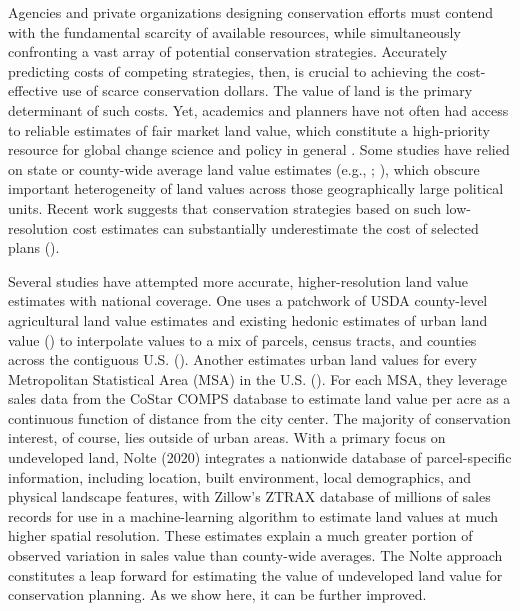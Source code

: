 \documentclass[12pt]{article}
\begin{document}
Agencies and private organizations designing conservation efforts must contend with the fundamental scarcity of available resources, while simultaneously confronting a vast array of potential conservation strategies. Accurately predicting costs of competing strategies, then, is crucial to achieving the cost-effective use of scarce conservation dollars. The value of land is the primary determinant of such costs. Yet, academics and planners have not often had access to reliable estimates of fair market land value, which constitute a high-priority resource for global change science and policy in general \cite{Coomes2018GeospatialPolicy}. Some studies have relied on state or county-wide average land value estimates (e.g., \cite{Withey2012MaximisingUSA}; \cite{Lawler2020PlanningConfiguration}),
which obscure important heterogeneity of land values across those geographically large political units. Recent work suggests that conservation strategies based on such low-resolution cost estimates can substantially underestimate the cost of selected plans (\cite{Nolte2020High-resolutionStates}). 

Several studies have attempted more accurate, higher-resolution land value estimates with national coverage. One uses a patchwork of USDA county-level agricultural land value estimates and existing hedonic estimates of urban land value (\cite{Kuminoff2013}) to interpolate values to a mix of parcels, census tracts, and counties across the contiguous U.S. (\cite{Larson2015}). Another estimates urban land values for every Metropolitan Statistical Area (MSA) in the U.S. (\cite{Albouy2018}). For each MSA, they leverage sales data from the CoStar COMPS database to estimate land value per acre as a continuous function of distance from the city center. The majority of conservation interest, of course, lies outside of urban areas. With a primary focus on undeveloped land, Nolte (2020) integrates a nationwide database of parcel-specific information, including location, built environment, local demographics, and physical landscape features, with Zillow’s ZTRAX database of millions of sales records for use in a machine-learning algorithm to estimate land values at much higher spatial resolution. These estimates explain a much greater portion of observed variation in sales value than county-wide averages. The Nolte approach constitutes a leap forward for estimating the value of undeveloped land value for conservation planning. As we show here, it can be further improved.
\end{document}
